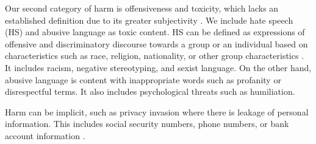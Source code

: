 Our second category of harm is offensiveness and toxicity, which %
lacks an established definition due to its greater subjectivity \cite{dev-etal-2022-measures,korre-etal-2023-harmful}. We include hate speech (HS) and abusive language as toxic content. HS can be defined as expressions of offensive and discriminatory discourse towards a group or an individual based on characteristics such as race, religion, nationality, or other group characteristics \cite{john2000hate,jahan2023systematic,basile2019semeval,davidson2017automated}. It includes racism, negative stereotyping, and sexist language. On the other hand, abusive language is content with inappropriate words such as profanity or disrespectful terms. It also includes psychological threats such as humiliation. %


Harm can be implicit, such as privacy invasion
where there is 
leakage of personal information. %
This includes social security numbers, phone numbers, or bank account information \cite{carlini2021extracting,brown2022does}. 


